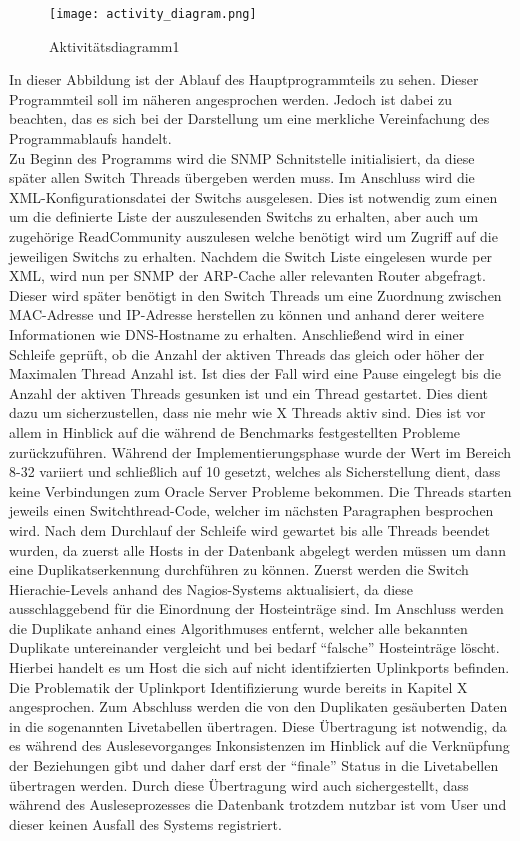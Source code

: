 \begin{figure}[H]
\centering
\texttt{[image: activity\_diagram.png]}
\caption{Aktivitätsdiagramm1}
\label{fig:activitydiagram1}
\end{figure}

In dieser Abbildung ist der Ablauf des Hauptprogrammteils zu sehen. Dieser Programmteil soll im näheren angesprochen werden. Jedoch ist dabei zu beachten, das es sich bei der Darstellung um eine merkliche Vereinfachung des Programmablaufs handelt.\\
Zu Beginn des Programms wird die SNMP Schnitstelle initialisiert, da diese später allen Switch Threads übergeben werden muss. Im Anschluss wird die XML-Konfigurationsdatei der Switchs ausgelesen. Dies ist notwendig zum einen um die definierte Liste der auszulesenden Switchs zu erhalten, aber auch um zugehörige ReadCommunity auszulesen welche benötigt wird um Zugriff auf die jeweiligen Switchs zu erhalten. Nachdem die Switch Liste eingelesen wurde per XML, wird nun per SNMP der ARP-Cache aller relevanten Router abgefragt. Dieser wird später benötigt in den Switch Threads um eine Zuordnung zwischen MAC-Adresse und IP-Adresse herstellen zu können und anhand derer weitere Informationen wie DNS-Hostname zu erhalten.
Anschließend wird in einer Schleife geprüft, ob die Anzahl der aktiven Threads das gleich oder höher der Maximalen Thread Anzahl ist. Ist dies der Fall wird eine Pause eingelegt bis die Anzahl der aktiven Threads gesunken ist und ein Thread gestartet. Dies dient dazu um sicherzustellen, dass nie mehr wie X Threads aktiv sind. Dies ist vor allem in Hinblick auf die während de Benchmarks festgestellten Probleme zurückzuführen. Während der Implementierungsphase wurde der Wert im Bereich 8-32 variiert und schließlich auf 10 gesetzt, welches als Sicherstellung dient, dass keine Verbindungen zum Oracle Server Probleme bekommen. Die Threads starten jeweils einen Switchthread-Code, welcher im nächsten Paragraphen besprochen wird. Nach dem Durchlauf der Schleife wird gewartet bis alle Threads beendet wurden, da zuerst alle Hosts in der Datenbank abgelegt werden müssen um dann eine Duplikatserkennung durchführen zu können. Zuerst werden die Switch Hierachie-Levels anhand des Nagios-Systems aktualisiert, da diese ausschlaggebend für die Einordnung der Hosteinträge sind. Im Anschluss werden die Duplikate anhand eines Algorithmuses entfernt, welcher alle bekannten Duplikate untereinander vergleicht und bei bedarf “falsche” Hosteinträge löscht. Hierbei handelt es um Host die sich auf nicht identifzierten Uplinkports befinden. Die Problematik der Uplinkport Identifizierung wurde bereits in Kapitel X angesprochen. Zum Abschluss werden die von den Duplikaten gesäuberten Daten in die sogenannten Livetabellen übertragen. Diese Übertragung ist notwendig, da es während des Auslesevorganges Inkonsistenzen im Hinblick auf die Verknüpfung der Beziehungen gibt und daher darf erst der “finale” Status in die Livetabellen übertragen werden. Durch diese Übertragung wird auch sichergestellt, dass während des Ausleseprozesses die Datenbank trotzdem nutzbar ist vom User und dieser keinen Ausfall des Systems registriert.\\

